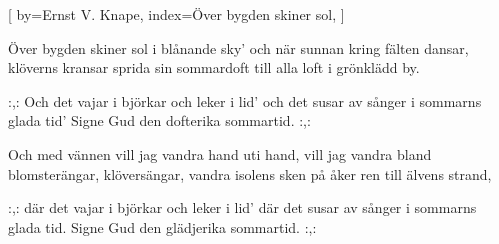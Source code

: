 

[
by={Ernst V. Knape},
index={Över bygden skiner sol},
]

\beginverse*
Över bygden skiner sol i blånande sky'
och när sunnan kring fälten dansar,
klöverns kransar
sprida sin sommardoft
till alla loft
i grönklädd by.
\endverse

\beginchorus
:,: Och det vajar i björkar och leker i lid'
och det susar av sånger i sommarns glada tid'
Signe Gud den dofterika sommartid. :,:
\endchorus							%

\beginverse* 
Och med vännen vill jag vandra hand uti hand,
vill jag vandra bland blomsterängar,
klöversängar,
vandra isolens sken
på åker ren
till älvens strand,
\endverse

\beginchorus
:,: där det vajar i björkar och leker i lid'
där det susar av sånger i sommarns glada tid.
Signe Gud den glädjerika sommartid. :,:
\endchorus	
\endsong


